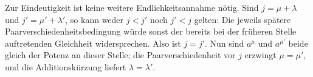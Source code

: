 \documentclass[main.tex]{subfiles}
\begin{document}
\begin{tabproofwide}
\end{tabproofwide}


Zur Eindeutigkeit ist keine weitere Endlichkeitsannahme nötig.  Sind
\(j=\mu+\lambda\) und \(j'=\mu'+\lambda'\), so kann weder \(j<j'\)
noch \(j'<j\) gelten: Die jeweils spätere
Paarverschiedenheitsbedingung würde sonst der bereits bei der früheren
Stelle auftretenden Gleichheit widersprechen.  Also ist \(j=j'\).  Nun sind
\(a^\mu\) und \(a^{\mu'}\) beide gleich der Potenz an dieser Stelle;
die Paarverschiedenheit vor \(j\) erzwingt \(\mu=\mu'\), und die
Additionskürzung liefert \(\lambda=\lambda'\).
\end{document}
